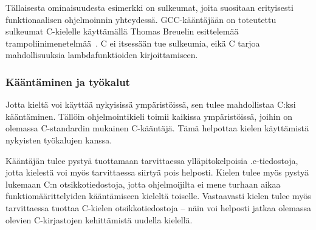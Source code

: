 Tällaisesta ominaisuudesta esimerkki on sulkeumat, joita suositaan erityisesti
funktionaalisen ohjelmoinnin yhteydessä. GCC-kääntäjään on toteutettu sulkeumat
C-kielelle käyttämällä Thomas Breuelin esittelemää
trampoliinimenetelmää~\citep{gccnested, cppclosure}. C ei itsessään tue
sulkeumia, eikä C tarjoa mahdollisuuksia lambdafunktioiden kirjoittamiseen.

%

\subsubsection{Kääntäminen ja työkalut}

Jotta kieltä voi käyttää nykyisissä ympäristöissä, sen tulee mahdollistaa C:ksi
kääntäminen. Tällöin ohjelmointikieli toimii kaikissa ympäristöissä, joihin on
olemassa C-standardin mukainen C-kääntäjä. Tämä helpottaa kielen käyttämistä
nykyisten työkalujen kanssa.



Kääntäjän tulee pystyä tuottamaan tarvittaessa ylläpitokelpoisia .c-tiedostoja,
jotta kielestä voi myös tarvittaessa siirtyä pois helposti.  Kielen tulee myös
pystyä lukemaan C:n otsikkotiedostoja, jotta ohjelmoijilta ei mene turhaan
aikaa funktiomäärittelyiden kääntämiseen kieleltä toiselle. Vastaavasti kielen
tulee myös tarvittaessa tuottaa C-kielen otsikkotiedostoja -- näin voi helposti
jatkaa olemassa olevien C-kirjastojen kehittämistä uudella kielellä.


